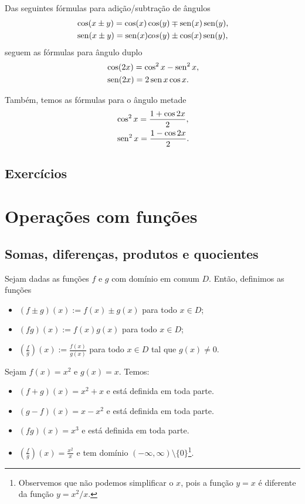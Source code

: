 Das seguintes fórmulas para adição/subtração de ângulos
\begin{align}
  &\cos(x\pm y) = \cos(x)\cos(y) \mp \operatorname{sen}(x)\operatorname{sen}(y),\\
  &\operatorname{sen}(x\pm y) = \operatorname{sen}(x)cos(y) \pm \cos(x)\operatorname{sen}(y),
\end{align}
seguem as fórmulas para ângulo duplo
\begin{align}
  &\cos(2x) = \cos^2x - \operatorname{sen}^2x,\\
  &\operatorname{sen}(2x) = 2\operatorname{sen} x\cos x.
\end{align}

Também, temos as fórmulas para o ângulo metade
\begin{align}
  &\cos^2 x = \frac{1 + \cos 2x}{2},\\
  &\operatorname{sen}^2 x = \frac{1 - \cos 2x}{2}.
\end{align}

\subsection*{Exercícios}

\emconstrucao

\section{Operações com funções}\label{cap_funcao_sec_opfun}

\subsection{Somas, diferenças, produtos e quocientes}

Sejam dadas as funções $f$ e $g$ com domínio em comum $D$. Então, definimos as funções
\begin{itemize}
\item $(f\pm g)(x) := f(x) \pm g(x)$ para todo $x\in D$;
\item $(fg)(x) := f(x)g(x)$ para todo $x\in D$;
\item $\displaystyle \left(\frac{f}{g}\right)(x) := \frac{f(x)}{g(x)}$ para todo $x\in D$ tal que $g(x)\neq 0$.
\end{itemize}

\begin{ex}
  Sejam $f(x)=x^2$ e $g(x)=x$. Temos:
  \begin{itemize}
  \item $(f+g)(x) = x^2 + x$ e está definida em toda parte.
  \item $(g-f)(x) = x - x^2$ e está definida em toda parte.
  \item $(fg)(x) = x^3$ e está definida em toda parte.
  \item $\left(\frac{f}{g}\right)(x) = \frac{x^2}{x}$ e tem domínio $(-\infty, \infty)\setminus \{0\}$\footnote{Observemos que não podemos simplificar o $x$, pois a função $y=x$ é diferente da função $y=x^2/x$.}.
  \end{itemize}
\end{ex}

